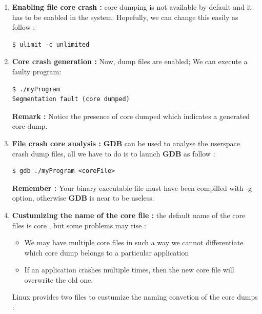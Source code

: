 \begin{enumerate}
	\item \textbf{Enabling file core crash : } core dumping is not available by default and it has to be enabled in the system. Hopefully, we can change this easily as follow :
	
\begin{lstlisting}[style=BashInputStyle]	
$ ulimit -c unlimited
\end{lstlisting}	


	\item \textbf{Core crash generation : } Now, dump files are enabled; We can execute a faulty program:
\begin{lstlisting}[style=BashInputStyle]	
$ ./myProgram
Segmentation fault (core dumped)	
\end{lstlisting}
\textbf{Remark : } Notice the presence of \og core dumped \fg which indicates a generated core dump.	
	\item \textbf{File crash core analysis : } \textbf{GDB} can be used to analyse the userspace crash dump files, all we have to do is to launch \textbf{GDB} as follow : 
\begin{lstlisting}[style=BashInputStyle]	
$ gdb ./myProgram <coreFile>	
\end{lstlisting}	


\textbf{\color{orange}Remember :} Your binary executable file must have been compilled with -g option, otherwise \textbf{GDB} is near to be useless.

	\item \textbf{Custumizing the name of the core file : }
	the default name of the core files is \og core \fg, but some problems may rise :
		\begin{itemize}
			\item {We may have multiple core files in such a way we cannot differentiate which core dump belongs to a particular
application}
			\item {If an application crashes multiple times, then the new core file will overwrite the old one.}
		\end{itemize}
		
		Linux provides two files to custumize the naming convetion of the core dumps :
		

\end{enumerate}
